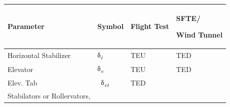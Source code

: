 \documentclass[
]{book}
\begin{document}
\begin{longtable}[]{@{}llll@{}}
\toprule
\begin{minipage}[b]{0.27\columnwidth}\raggedright
\textbf{Parameter}\strut
\end{minipage} & \begin{minipage}[b]{0.17\columnwidth}\raggedright
\textbf{Symbol}\strut
\end{minipage} & \begin{minipage}[b]{0.22\columnwidth}\raggedright
\textbf{Flight Test}\strut
\end{minipage} & \begin{minipage}[b]{0.22\columnwidth}\raggedright
\textbf{SFTE/}

\textbf{Wind Tunnel}\strut
\end{minipage}\tabularnewline
\midrule
\endhead
\begin{minipage}[t]{0.27\columnwidth}\raggedright
Horizontal Stabilizer\strut
\end{minipage} & \begin{minipage}[t]{0.17\columnwidth}\raggedright
δ\emph{\textsubscript{i}}\strut
\end{minipage} & \begin{minipage}[t]{0.22\columnwidth}\raggedright
TEU\strut
\end{minipage} & \begin{minipage}[t]{0.22\columnwidth}\raggedright
TED\strut
\end{minipage}\tabularnewline
\begin{minipage}[t]{0.27\columnwidth}\raggedright
Elevator\strut
\end{minipage} & \begin{minipage}[t]{0.17\columnwidth}\raggedright
δ\emph{\textsubscript{e}}\strut
\end{minipage} & \begin{minipage}[t]{0.22\columnwidth}\raggedright
TEU\strut
\end{minipage} & \begin{minipage}[t]{0.22\columnwidth}\raggedright
TED\strut
\end{minipage}\tabularnewline
\begin{minipage}[t]{0.27\columnwidth}\raggedright
Elev. Tab\strut
\end{minipage} & \begin{minipage}[t]{0.17\columnwidth}\raggedright
~δ\emph{\textsubscript{et}}\strut
\end{minipage} & \begin{minipage}[t]{0.22\columnwidth}\raggedright
TED\strut
\end{minipage} & \begin{minipage}[t]{0.22\columnwidth}\raggedright
\strut
\end{minipage}\tabularnewline
\begin{minipage}[t]{0.27\columnwidth}\raggedright
Stabilators or Rollervators,


\end{minipage}
\end{longtable}
\end{document}
